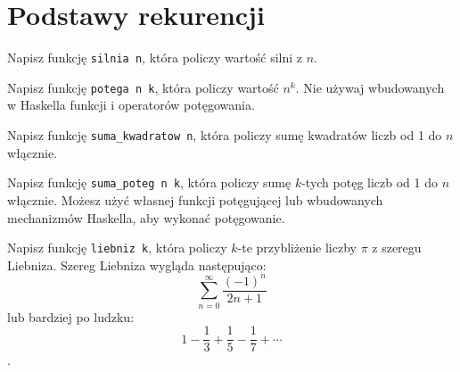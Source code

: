 \section{Podstawy rekurencji}
\begin{questions}
  \item {
    Napisz funkcję \texttt{silnia n}, która policzy wartość silni z $n$.
  }
  \item {
    Napisz funkcję \texttt{potega n k}, która policzy wartość $n^k$. Nie
    używaj wbudowanych w Haskella funkcji i operatorów potęgowania.
  }
  \item {
    Napisz funkcję \texttt{suma\_kwadratow n}, która policzy sumę kwadratów
    liczb od 1 do $n$ włącznie.
  }
  \item {
    Napisz funkcję \texttt{suma\_poteg n k}, która policzy sumę $k$-tych potęg
    liczb od 1 do $n$ włącznie. Możesz użyć własnej funkcji potęgującej lub
    wbudowanych mechanizmów Haskella, aby wykonać potęgowanie.
  }
  \item {
    Napisz funkcję \texttt{liebniz k}, która policzy $k$-te przybliżenie liczby
    $\pi$ z szeregu Liebniza. Szereg Liebniza wygląda następująco:
    $$\sum_{n=0}^{\infty} \frac{(-1)^n}{2n+1}$$ lub bardziej po ludzku:
    $$1-\frac13 + \frac15 - \frac17 + \cdots$$.
  }
\end{questions}
